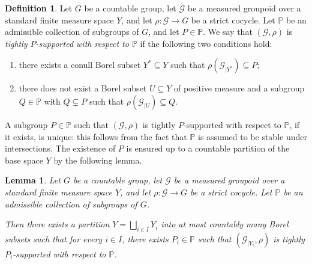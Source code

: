 \documentclass[11pt]{article}
\numberwithin{equation}{section}
\let\mathcal\mathscr
\theoremstyle{plain}
\newtheorem{lemma}[theo]{Lemma}
\theoremstyle{definition}
\newtheorem{de}[theo]{Definition}
\let\Dunion\bigsqcup
\newcommand{\calg}{\mathcal{G}}
\begin{document}
\begin{de}
Let $G$ be a countable group, let $\mathcal{G}$ be a measured groupoid over a standard finite measure space $Y$, and let $\rho:\calg\to G$ be a strict cocycle. Let $\mathbb{P}$ be an admissible collection of subgroups of $G$, and let $P\in\mathbb{P}$. We say that $(\calg,\rho)$ is \emph{tightly $P$-supported with respect to $\mathbb{P}$} if the following two conditions hold:
\begin{enumerate}
\item there exists a conull Borel subset $Y^*\subseteq Y$ such that $\rho(\calg_{|Y^*})\subseteq P$;
\item there does not exist a Borel subset $U\subseteq Y$ of positive measure and a subgroup $Q\in\mathbb{P}$ with $Q\subsetneq P$ such that $\rho(\calg_{|U})\subseteq Q$.
\end{enumerate}
\end{de}

A subgroup $P\in\mathbb{P}$ such that $(\calg,\rho)$ is tightly $P$-supported with respect to $\mathbb{P}$, if it exists, is unique: this follows from the fact that $\mathbb{P}$ is assumed to be stable under intersections. The existence of $P$ is ensured up to a countable partition of the base space $Y$ by the following lemma.

\begin{lemma}\label{lemma:support}
Let $G$ be a countable group, let $\calg$ be a measured groupoid over a standard finite measure space $Y$, and let $\rho:\calg\to G$ be a strict cocycle. Let $\mathbb{P}$ be an admissible collection of subgroups of $G$.

Then there exists a partition $Y=\Dunion_{i\in I}Y_i$ into at most countably many Borel subsets such that for every $i\in I$, there exists $P_i\in\mathbb{P}$ such that $(\calg_{|Y_i},\rho)$ is tightly $P_i$-supported with respect to $\mathbb{P}$.
\end{lemma}
\end{document}
